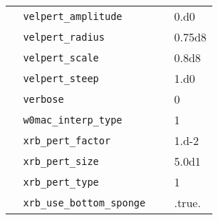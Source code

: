 {\begin{center}
\begin{longtable}{|l|p{3.25in}|l|}
\verb=  velpert_amplitude =  &   &  0.d0 \\
\verb=  velpert_radius =  &   &  0.75d8 \\
\verb=  velpert_scale =  &   &  0.8d8 \\
\verb=  velpert_steep =  &   &  1.d0 \\
\verb=  verbose =  &   &  0 \\
\verb=  w0mac_interp_type =  &   &  1 \\
\verb=  xrb_pert_factor =  &   &  1.d-2 \\
\verb=  xrb_pert_size =  &   &  5.0d1 \\
\verb=  xrb_pert_type =  &   &  1 \\
\verb=  xrb_use_bottom_sponge =  &   &  .true. \\

\end{longtable}
\end{center}

} %

%

